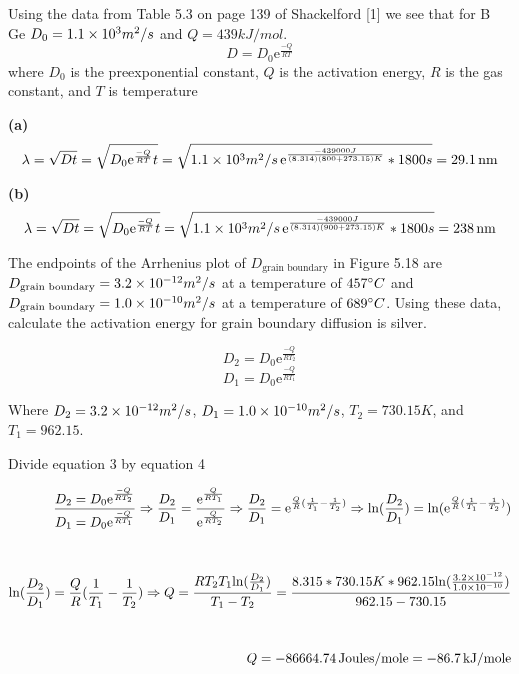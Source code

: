 \documentclass[12pt]{article}
\newenvironment{problem}[2][Problem]{\begin{trivlist}
\item[\hskip \labelsep {\bfseries #1}\hskip \labelsep {\bfseries #2.}]}{\end{trivlist}}
\begin{document}
Using the data from Table 5.3 on page 139 of Shackelford [1] we see that for B Ge $D_0 = 1.1 \times 10^{3} m^2/s$ and $Q = 439kJ/mol$.
\begin{equation}
D = D_0 \mathrm{e}^{\frac{-Q}{RT}}
\end{equation}
where $D_0$ is the preexponential constant, $Q$ is the activation energy, $R$ is the gas constant, and $T$ is temperature

\textbf{(a)}
\begin{align*}
\lambda = \sqrt{Dt} = \sqrt{D_0 \mathrm{e}^{\frac{-Q}{RT}}t} = \sqrt{1.1\times 10^{3}m^2/s \,\mathrm{e}^{\frac{-439000J}{(8.314)(800 + 273.15)K}}*1800s} = 29.1 \,\text{nm}
\end{align*}

\textbf{(b)}
\begin{align*}
\lambda = \sqrt{Dt} = \sqrt{D_0 \mathrm{e}^{\frac{-Q}{RT}}t} = \sqrt{1.1\times 10^{3}m^2/s \,\mathrm{e}^{\frac{-439000J}{(8.314)(900 + 273.15)K}}*1800s} = 238 \,\text{nm}
\end{align*}

\begin{problem}{5.29}
The endpoints of the Arrhenius plot of $D_{\text{grain boundary}}$ in Figure 5.18 are $D_{\text{grain boundary}} = 3.2\times 10^{-12} m^2/s$ at a temperature of $457\degree C$ and $D_{\text{grain boundary}} = 1.0\times 10^{-10} m^2/s$ at a temperature of $689\degree C$.  Using these data, calculate the activation energy for grain boundary diffusion is silver.
\end{problem}

\begin{equation}
D_2 = D_0 \mathrm{e}^{\frac{-Q}{RT_2}}
\end{equation}
\begin{equation}
D_1 = D_0 \mathrm{e}^{\frac{-Q}{RT_1}}
\end{equation}

Where $D_2 = 3.2\times 10^{-12}m^2/s$, $D_1 = 1.0\times 10^{-10}m^2/s$, $T_2 = 730.15 K$, and $T_1 = 962.15$.

Divide equation 3 by equation 4

\begin{align*}
\frac{D_2 = D_0 \mathrm{e}^{\frac{-Q}{RT_2}}}{D_1 = D_0 \mathrm{e}^{\frac{-Q}{RT_1}}} \Rightarrow \frac{D_2}{D_1} = \frac{\mathrm{e}^{\frac{Q}{RT_1}}}{\mathrm{e}^{\frac{Q}{RT_2}}} \Rightarrow \frac{D_2}{D_1} = \mathrm{e}^{\frac{Q}{R}(\frac{1}{T_1} - \frac{1}{T_2})} \Rightarrow \mathrm{ln}(\frac{D_2}{D_1}) = \mathrm{ln}(\mathrm{e}^{\frac{Q}{R}(\frac{1}{T_1} - \frac{1}{T_2})}) \\*[1cm]
 \mathrm{ln}(\frac{D_2}{D_1}) = \frac{Q}{R}(\frac{1}{T_1} - \frac{1}{T_2}) \Rightarrow Q = \frac{RT_2T_1\mathrm{ln}(\frac{D_2}{D_1})}{T_1 - T_2} = \frac{8.315*730.15K*962.15\mathrm{ln}(\frac{3.2\times 10^{-12}}{1.0\times 10^{-10}})}{962.15 - 730.15} \\*[1cm] Q = -86664.74\,\text{Joules/mole} = -86.7\,\text{kJ/mole}
\end{align*}
\end{document}
